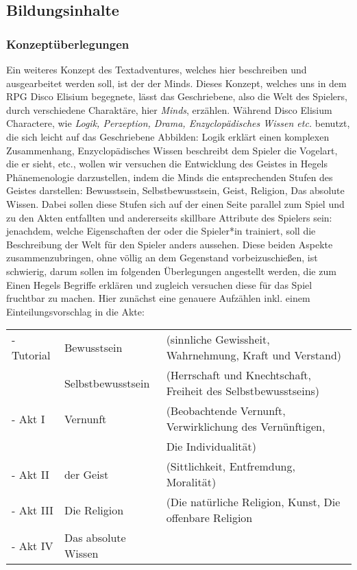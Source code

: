 \documentclass[a4paper, 12pt]{scrartcl}
\begin{document}
    \subsection{Bildungsinhalte} 
    
    \subsubsection{Konzeptüberlegungen}
    Ein weiteres Konzept des Textadventures, welches hier beschreiben und ausgearbeitet werden soll, ist der der \glqq Minds\grqq{}.
    Dieses Konzept, welches uns in dem RPG \glqq Disco Elisium\grqq{} begegnete, lässt das Geschriebene, also die Welt des Spielers, durch verschiedene Charaktäre, hier \textit{Minds}, erzählen.
    Während Disco Elisium Charactere, wie \textit{Logik, Perzeption, Drama, Enzyclopädisches Wissen etc.} benutzt, die sich leicht auf das Geschriebene Abbilden: Logik erklärt einen komplexen Zusammenhang, Enzyclopädisches Wissen beschreibt dem Spieler die Vogelart, die er sieht, etc., wollen wir versuchen die Entwicklung des Geistes in Hegels Phänemenologie darzustellen, indem die Minds die entsprechenden Stufen des Geistes darstellen: Bewusstsein, Selbstbewusstsein, Geist, Religion, Das absolute Wissen.
    Dabei sollen diese Stufen sich auf der einen Seite parallel zum Spiel und zu den Akten entfallten und andererseits skillbare Attribute des Spielers sein:
    jenachdem, welche Eigenschaften der oder die Spieler*in trainiert, soll die Beschreibung der Welt für den Spieler anders aussehen. 
    Diese beiden Aspekte zusammenzubringen, ohne völlig an dem Gegenstand vorbeizuschießen, ist schwierig, darum sollen im folgenden Überlegungen angestellt werden, die zum Einen Hegels Begriffe erklären und zugleich versuchen diese für das Spiel fruchtbar zu machen. 
    Hier zunächst eine genauere Aufzählen inkl. einem Einteilungsvorschlag in die Akte: \\

    \begin{tabular}[t] {l l l}
        - Tutorial & Bewusstsein & (sinnliche Gewissheit, Wahrnehmung, Kraft und Verstand) \\
        & Selbstbewusstsein & (Herrschaft und Knechtschaft, Freiheit des Selbstbewusstseins) \\
        - Akt I & Vernunft & (Beobachtende Vernunft, Verwirklichung des Vernünftigen, \\
        & & Die Individualität) \\
        - Akt II & der Geist & (Sittlichkeit, Entfremdung, Moralität) \\
        - Akt III& Die Religion & (Die natürliche Religion, Kunst, Die offenbare Religion \\
        - Akt IV & Das absolute Wissen &
    \end{tabular}
    \\  
\end{document}
